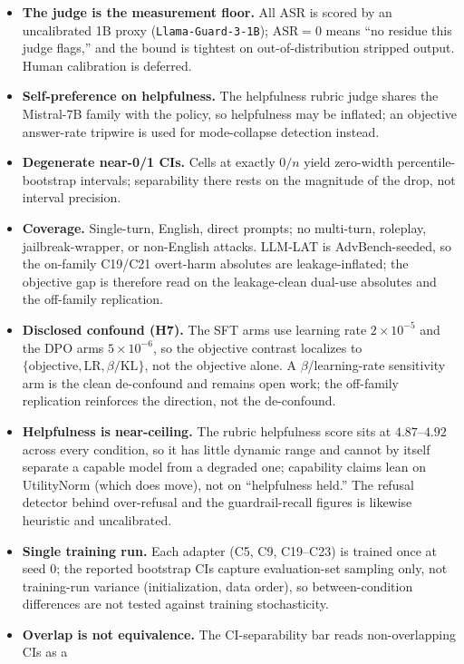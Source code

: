 \documentclass[11pt,a4paper]{article}
\newcommand{\code}[1]{\texttt{#1}}
\begin{document}
\begin{itemize}[leftmargin=1.4em,itemsep=2pt]
  \item \textbf{The judge is the measurement floor.} All ASR is scored by an uncalibrated 1B
  proxy (\code{Llama-Guard-3-1B}); $\text{ASR}=0$ means ``no residue this judge flags,'' and
  the bound is tightest on out-of-distribution stripped output. Human calibration is deferred.
  \item \textbf{Self-preference on helpfulness.} The helpfulness rubric judge shares the
  Mistral-7B family with the policy, so helpfulness may be inflated; an objective answer-rate
  tripwire is used for mode-collapse detection instead.
  \item \textbf{Degenerate near-0/1 CIs.} Cells at exactly $0/n$ yield zero-width
  percentile-bootstrap intervals; separability there rests on the magnitude of the drop, not
  interval precision.
  \item \textbf{Coverage.} Single-turn, English, direct prompts; no multi-turn, roleplay,
  jailbreak-wrapper, or non-English attacks. LLM-LAT is AdvBench-seeded, so the on-family
  C19/C21 overt-harm absolutes are leakage-inflated; the objective gap is therefore read on the
  leakage-clean dual-use absolutes and the off-family replication.
  \item \textbf{Disclosed confound (H7).} The SFT arms use learning rate $2\times10^{-5}$ and
  the DPO arms $5\times10^{-6}$, so the objective contrast localizes to
  $\{\text{objective}, \text{LR}, \beta/\text{KL}\}$, not the objective alone. A
  $\beta$/learning-rate sensitivity arm is the clean de-confound and remains open work; the
  off-family replication reinforces the direction, not the de-confound.
  \item \textbf{Helpfulness is near-ceiling.} The rubric helpfulness score sits at
  $4.87$--$4.92$ across every condition, so it has little dynamic range and cannot by itself
  separate a capable model from a degraded one; capability claims lean on UtilityNorm (which
  does move), not on ``helpfulness held.'' The refusal detector behind over-refusal and the
  guardrail-recall figures is likewise heuristic and uncalibrated.
  \item \textbf{Single training run.} Each adapter (C5, C9, C19--C23) is trained once at
  seed 0; the reported bootstrap CIs capture evaluation-set sampling only, not training-run
  variance (initialization, data order), so between-condition differences are not tested
  against training stochasticity.
  \item \textbf{Overlap is not equivalence.} The CI-separability bar reads non-overlapping CIs as a

\end{itemize}
\end{document}
